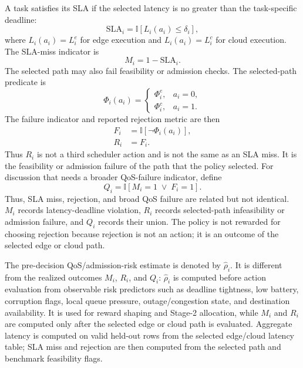 A task satisfies its SLA if the selected latency is no greater than the task-specific deadline:
\begin{equation}
\mathrm{SLA}_i = \mathbb{I}\left[L_i(a_i) \leq \delta_i\right],
\label{eq:sla_flag}
\end{equation}
where $L_i(a_i)=L_i^e$ for edge execution and $L_i(a_i)=L_i^c$ for cloud execution. The SLA-miss indicator is
\begin{equation}
M_i=1-\mathrm{SLA}_i.
\label{eq:sla_miss}
\end{equation}
The selected path may also fail feasibility or admission checks. The selected-path predicate is
\begin{equation}
\Phi_i(a_i)=
\begin{cases}
\Phi_i^e, & a_i=0,\\
\Phi_i^c, & a_i=1.
\end{cases}
\label{eq:selected_feasibility}
\end{equation}
The failure indicator and reported rejection metric are then
\begin{align}
F_i &= \mathbb{I}\left[\neg \Phi_i(a_i)\right], \\
R_i &= F_i.
\label{eq:rejection_flag}
\end{align}
Thus $R_i$ is not a third scheduler action and is not the same as an SLA miss. It is the feasibility or admission failure of the path that the policy selected.
For discussion that needs a broader QoS-failure indicator, define
\begin{equation}
Q_i=\mathbb{I}\left[M_i=1 \;\lor\; F_i=1\right].
\label{eq:qos_failure_flag}
\end{equation}
Thus, SLA miss, rejection, and broad QoS failure are related but not identical. $M_i$ records latency-deadline violation, $R_i$ records selected-path infeasibility or admission failure, and $Q_i$ records their union. The policy is not rewarded for choosing rejection because rejection is not an action; it is an outcome of the selected edge or cloud path.

The pre-decision QoS/admission-risk estimate is denoted by $\hat{\rho}_i$. It is different from the realized outcomes $M_i$, $R_i$, and $Q_i$: $\hat{\rho}_i$ is computed before action evaluation from observable risk predictors such as deadline tightness, low battery, corruption flags, local queue pressure, outage/congestion state, and destination availability. It is used for reward shaping and Stage-2 allocation, while $M_i$ and $R_i$ are computed only after the selected edge or cloud path is evaluated. Aggregate latency is computed on valid held-out rows from the selected edge/cloud latency table; SLA miss and rejection are then computed from the selected path and benchmark feasibility flags.

